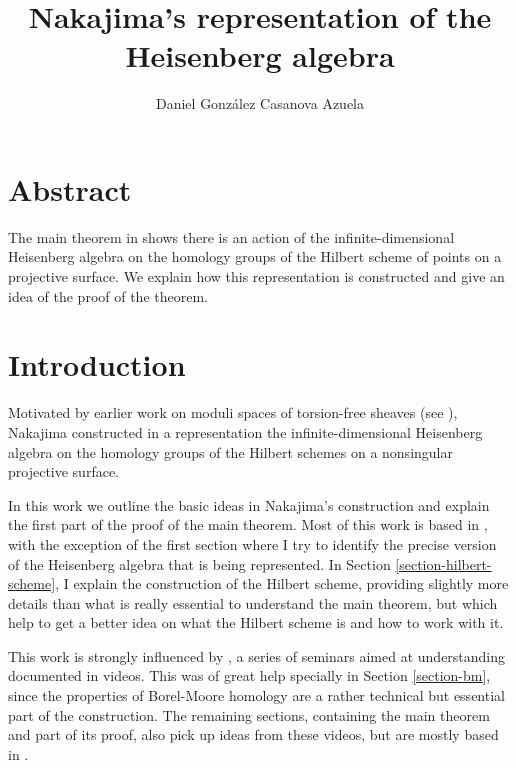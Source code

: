 
\usepackage{graphicx}
\usepackage{url}



\title{Nakajima's representation of the Heisenberg algebra}
\author{Daniel González Casanova Azuela}

\maketitle

\label{section-phantom}

\section*{Abstract}
\label{section-abs}

\noindent
The main theorem in \cite{Nakajima-Heis}
shows there is an action of the infinite-dimensional
Heisenberg algebra
on the homology groups of the Hilbert
scheme of points on a projective surface.
We explain how this representation is constructed
and give an idea of the proof of the theorem.



\tableofcontents

\section{Introduction}
\label{section-intro}

\noindent
Motivated by earlier work on moduli spaces of 
torsion-free sheaves
(see \cite{Nakajima-ALE}),
Nakajima constructed in \cite{Nakajima-Heis}
a representation the infinite-dimensional Heisenberg
algebra on the homology groups of the Hilbert schemes
on a nonsingular projective surface.

In this work we outline the basic ideas in Nakajima's construction
and explain the first part of the proof of the main theorem.
Most of this work is based in \cite{Nakajima-lectures},
with the exception of the first section
where I try to identify the precise version of the Heisenberg
algebra that is being represented.
In Section \ref{section-hilbert-scheme},
I explain the construction of the Hilbert scheme,
providing slightly more details than what is really essential 
to understand the main theorem,
but which help to get a better idea on what the Hilbert scheme is
and how to work with it.

This work is strongly influenced by \cite{videos}, 
a series of seminars aimed at understanding \cite{Nakajima-lectures}
documented in videos.
This was of great help
specially in Section \ref{section-bm}, since
the properties of Borel-Moore homology are a rather technical
but essential part of the construction.
The remaining sections, containing the main theorem
and part of its proof,
also pick up ideas from these videos,
but are mostly based in \cite{Nakajima-lectures}.



